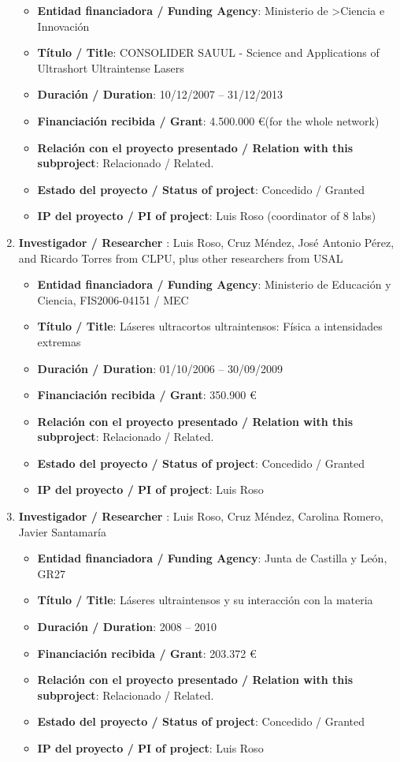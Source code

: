 \begin{enumerate}
 
\begin{itemize}
	\item {\bf Entidad financiadora / Funding Agency}: Ministerio de >Ciencia e Innovaci\'on
	\item {\bf Título / Title}: CONSOLIDER SAUUL - Science and Applications of Ultrashort Ultraintense Lasers
	\item {\bf Duración / Duration}: 10/12/2007 -- 31/12/2013
	\item {\bf Financiación recibida / Grant}: 4.500.000 \euro (for the whole network)
	\item {\bf Relación con el proyecto presentado / Relation with this subproject}: Relacionado / Related. 
	\item {\bf Estado del proyecto / Status of project}: Concedido / Granted
	\item {\bf IP del proyecto / PI of project}: Luis Roso (coordinator of 8 labs)
\end{itemize}
\item {\bf Investigador / Researcher }: Luis Roso, Cruz M\'endez, Jos\'e Antonio P\'erez, and Ricardo Torres from CLPU, plus other researchers from USAL
\begin{itemize}
	\item {\bf Entidad financiadora / Funding Agency}: Ministerio de Educaci\'on y Ciencia,  FIS2006-04151     / MEC
	\item {\bf Título / Title}: L\'aseres ultracortos ultraintensos: F\'isica a intensidades extremas
	\item {\bf Duración / Duration}: 01/10/2006 -- 30/09/2009
	\item {\bf Financiación recibida / Grant}: 350.900 \euro 
	\item {\bf Relación con el proyecto presentado / Relation with this subproject}: Relacionado / Related. 
	\item {\bf Estado del proyecto / Status of project}: Concedido / Granted
	\item {\bf IP del proyecto / PI of project}: Luis Roso
\end{itemize}
\item {\bf Investigador / Researcher }: Luis Roso, Cruz M\'endez, Carolina Romero, Javier Santamar\'ia
\begin{itemize}
	\item {\bf Entidad financiadora / Funding Agency}: Junta de Castilla y Le\'on, GR27
	\item {\bf Título / Title}: L\'aseres ultraintensos y su interacci\'on con la materia
	\item {\bf Duración / Duration}: 2008 -- 2010
	\item {\bf Financiación recibida / Grant}: 203.372 \euro 
	\item {\bf Relación con el proyecto presentado / Relation with this subproject}: Relacionado / Related. 
	\item {\bf Estado del proyecto / Status of project}: Concedido / Granted
	\item {\bf IP del proyecto / PI of project}: Luis Roso
\end{itemize}

\end{enumerate}

